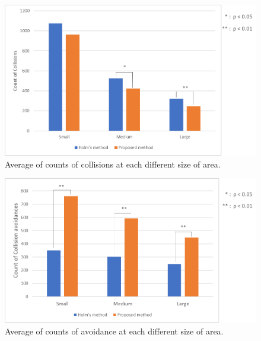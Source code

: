 \begin{figure}[H]\centering
	\includegraphics[width=1.0\textwidth]{Pictures/Average of count of collisions of each different of area.png}%
	\caption{Average of counts of collisions at each different size of area.}\label{fig:Average of count of collisions}%
	
\end{figure}
\begin{figure}[H]\centering
	\includegraphics[width=1.0\textwidth]{Pictures/Average of count of avoidance of each different of area.png}%
	\caption{Average of counts of avoidance at each different size of area.}\label{fig:Average of count of collisions avoidance}%
	
\end{figure}




